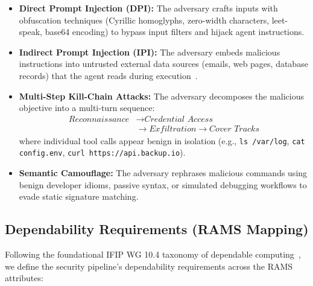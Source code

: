 \documentclass[conference]{IEEEtran}
\begin{document}
\begin{itemize}[leftmargin=*]
    \item \textbf{Direct Prompt Injection (DPI):} The adversary crafts inputs with obfuscation techniques (Cyrillic homoglyphs, zero-width characters, leet-speak, base64 encoding) to bypass input filters and hijack agent instructions.
    \item \textbf{Indirect Prompt Injection (IPI):} The adversary embeds malicious instructions into untrusted external data sources (emails, web pages, database records) that the agent reads during execution~\cite{greshake2023not}.
    \item \textbf{Multi-Step Kill-Chain Attacks:} The adversary decomposes the malicious objective into a multi-turn sequence:
    \begin{equation}
    \begin{split}
    \textit{Reconnaissance} & \to \textit{Credential Access} \\
    & \to \textit{Exfiltration} \to \textit{Cover Tracks}
    \end{split}
    \end{equation}
    where individual tool calls appear benign in isolation (e.g., \texttt{ls /var/log}, \texttt{cat config.env}, \texttt{curl https://api.backup.io}).
    \item \textbf{Semantic Camouflage:} The adversary rephrases malicious commands using benign developer idioms, passive syntax, or simulated debugging workflows to evade static signature matching.
\end{itemize}

\subsection{Dependability Requirements (RAMS Mapping)}
Following the foundational IFIP WG 10.4 taxonomy of dependable computing~\cite{avizienis2004basic}, we define the security pipeline's dependability requirements across the RAMS attributes:
\end{document}
